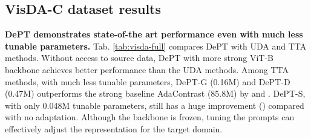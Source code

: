 \documentclass{article} \usepackage{iclr2023_conference,times}
\begin{document}
\subsection{VisDA-C dataset results}
\textbf{DePT demonstrates state-of-the art performance even with much less tunable parameters.} Tab. \ref{tab:visda-full} compares DePT with UDA and TTA methods. Without access to source data, DePT with more strong ViT-B backbone achieves better performance than the UDA methods. Among TTA methods, with much less tunable parameters, DePT-G (0.16M) and DePT-D (0.47M) outperforms the strong baseline AdaContrast (85.8M) by  and . DePT-S, with only 0.048M tunable parameters, still has a huge improvement () compared with no adaptation. Although the backbone is frozen, tuning the prompts can effectively adjust the representation for the target domain.
\end{document}
